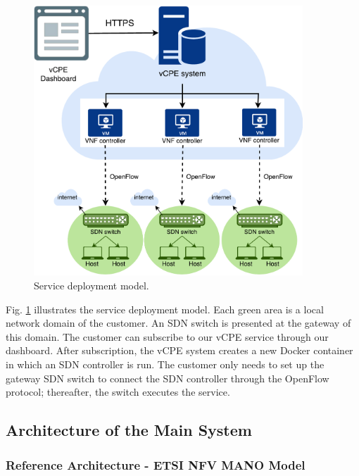 \begin{figure}[!t]
\centering
\includegraphics[width=0.9\textwidth]{./fig/hsnl_service_deployment}
\caption{Service deployment model.}
\label{fig:hsnl_service_deployment}
\end{figure}

Fig. \ref{fig:hsnl_service_deployment} illustrates the service deployment model. Each green area is a local network domain of the customer. An SDN switch is presented at the gateway of this domain. The customer can subscribe to our vCPE service through our dashboard. After subscription, the vCPE system creates a new Docker container in which an SDN controller is run. The customer only needs to set up the gateway SDN switch to connect the SDN controller through the OpenFlow protocol; thereafter, the switch executes the service.


\subsection{Architecture of the Main System}
\subsubsection{Reference Architecture - ETSI NFV MANO Model}

